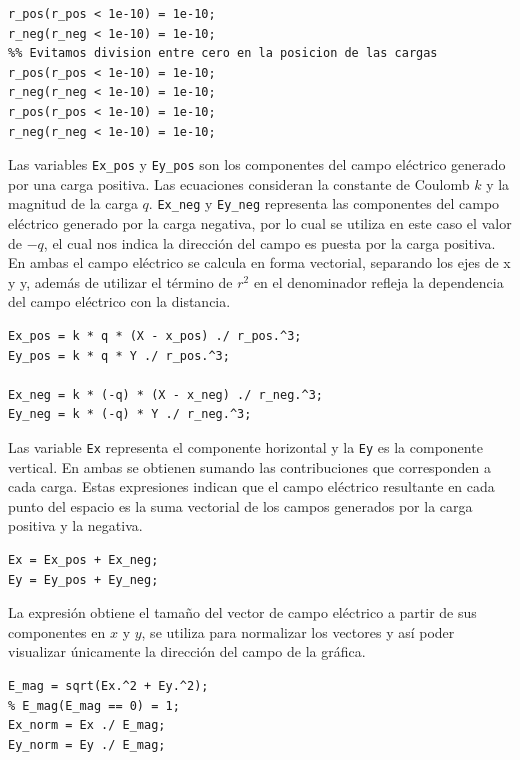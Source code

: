\begin{lstlisting}[style=Matlab-editor]
r_pos(r_pos < 1e-10) = 1e-10;
r_neg(r_neg < 1e-10) = 1e-10;
%% Evitamos division entre cero en la posicion de las cargas
r_pos(r_pos < 1e-10) = 1e-10;
r_neg(r_neg < 1e-10) = 1e-10;
r_pos(r_pos < 1e-10) = 1e-10;
r_neg(r_neg < 1e-10) = 1e-10;
\end{lstlisting}

\tab Las variables \verb|Ex_pos| y \verb|Ey_pos| son los componentes del campo eléctrico generado por una carga positiva. Las ecuaciones consideran la constante de Coulomb $k$ y la magnitud de la carga $q$. \verb|Ex_neg| y \verb|Ey_neg| representa las componentes del campo eléctrico generado por la carga negativa, por lo cual se utiliza en este caso el valor de $-q$, el cual nos indica la dirección del campo es puesta por la carga positiva. En ambas el campo eléctrico se calcula en forma vectorial, separando los ejes de x y y, además de utilizar el término de $r^2$ en el denominador refleja la dependencia del campo eléctrico con la distancia.

\begin{lstlisting}[style=Matlab-editor]
%% Campo electrico de cada carga
Ex_pos = k * q * (X - x_pos) ./ r_pos.^3;
Ey_pos = k * q * Y ./ r_pos.^3;

Ex_neg = k * (-q) * (X - x_neg) ./ r_neg.^3;
Ey_neg = k * (-q) * Y ./ r_neg.^3;
\end{lstlisting}

\tab Las variable \verb|Ex| representa el componente horizontal y la \verb|Ey| es la componente vertical. En ambas se obtienen sumando las contribuciones que corresponden a cada carga. Estas expresiones indican que el campo eléctrico resultante en cada punto del espacio es la suma vectorial de los campos generados por la carga positiva y la negativa.
\begin{lstlisting}[style=Matlab-editor]
%% Campo total (superposicion)
Ex = Ex_pos + Ex_neg;
Ey = Ey_pos + Ey_neg;
\end{lstlisting}

\tab La expresión obtiene el tamaño del vector de campo eléctrico a partir de sus componentes en $x$ y $y$, se utiliza para normalizar los vectores y así poder
visualizar únicamente la dirección del campo de la gráfica.

\begin{lstlisting}[style=Matlab-editor]
%% Normalizamos para que todas las flechas tengan el mismo tamaño
E_mag = sqrt(Ex.^2 + Ey.^2);
% E_mag(E_mag == 0) = 1;
Ex_norm = Ex ./ E_mag;
Ey_norm = Ey ./ E_mag;
\end{lstlisting}

